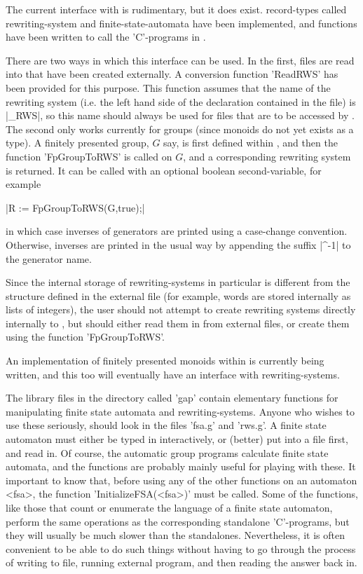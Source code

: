 
The current interface with {\GAP} is rudimentary, but it does exist.
{\GAP} record-types called rewriting-system and finite-state-automata
have been implemented, and {\GAP} functions have been written to call the
'C'-programs in {\KBMAG}.

There are two ways in which this interface can be used.
In the first, files are read into {\GAP} that have been created externally.
A {\GAP} conversion function 'ReadRWS' has been provided for this purpose.
This function assumes that the name of the rewriting system (i.e. the left
hand side of the declaration contained in the file) is |_RWS|, so this
name should always be used for files that are to be accessed by {\GAP}.
The second only works currently for groups (since monoids do not yet
exists as a {\GAP} type). A finitely presented group, $G$ say, is first
defined within {\GAP}, and then the {\GAP} function 'FpGroupToRWS' is called
on $G$, and a corresponding rewriting system is returned.
It can be called with an optional boolean second-variable, for example

|R := FpGroupToRWS(G,true);|

in which case inverses of generators are
printed using a case-change convention. Otherwise, inverses are printed in
the usual way by appending the suffix |^-1| to the generator name.

Since the internal storage of rewriting-systems in particular is
different from the structure defined in the external file (for example,
words are stored internally as lists of integers), the user should not
attempt to create rewriting systems directly internally to {\GAP},
but should either read them in from external files, or create them using the
function 'FpGroupToRWS'.

An implementation of finitely presented monoids within {\GAP} is currently
being written, and this too will eventually have an interface with
rewriting-systems.
 
The library files in the directory called 'gap' contain elementary functions
for manipulating finite state automata and rewriting-systems.
Anyone who wishes to use these seriously, should look in the files 'fsa.g' and
'rws.g'. A finite state automaton must either be typed in
interactively, or (better) put into a file first, and read in. Of course,
the automatic group programs calculate finite state automata, and the
functions are probably mainly useful for playing with these. It important to
know that, before using any of the other {\GAP} functions on an automaton <fsa>,
the function 'InitializeFSA(<fsa>)' must be called. Some of the functions,
like those that count or enumerate the language of a finite state automaton,
perform the same operations as the corresponding standalone 'C'-programs,
but they will usually be much slower than the standalones. Nevertheless,
it is often convenient to be able to do such things without having to go
through the process of writing to file, running external program, and then
reading the answer back in.

